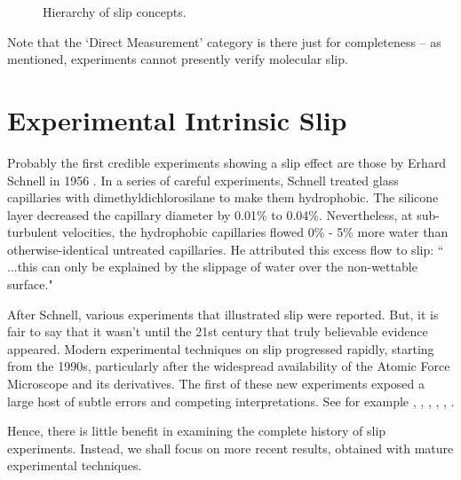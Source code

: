 \documentclass[12pt, a4paper, twoside, openright]{book}
\begin{document}
\begin{figure}[ht]
\caption{Hierarchy of slip concepts.} \label{slipconcepts}
\end{figure}

Note that the `Direct Measurement' category is there just for completeness -- as mentioned,  experiments cannot presently verify molecular slip.

\clearpage
\section{Experimental Intrinsic Slip}

Probably the first credible experiments showing a slip effect are those by Erhard Schnell in 1956 \cite{Schnell1956}. In a series of careful experiments, Schnell treated glass capillaries with dimethyldichlorosilane to make them hydrophobic. The silicone layer decreased the capillary diameter by 0.01\% to 0.04\%. Nevertheless, at sub-turbulent velocities, the hydrophobic capillaries flowed 0\% - 5\% more water than otherwise-identical untreated capillaries. He attributed this excess flow to slip: `` ...this can only be explained by the slippage of water over the non-wettable surface."  

After Schnell, various experiments that illustrated slip were reported. But, it is fair to say that it wasn't until the 21st century that truly believable evidence appeared.
Modern experimental techniques on slip progressed rapidly, starting from the 1990s, particularly after the widespread availability of the Atomic Force Microscope and its derivatives. 
The first of these new experiments exposed a large host of subtle errors and competing interpretations. 
See for example \cite{Pit2000}, \cite{CraigNetoWilliams2001}, \cite{BaudryCharlaix2001}, \cite{ZhuGranick2001}, \cite{Bonaccurso2002}, \cite{Neto2003}.

Hence, there is little benefit in examining the complete history of slip experiments.  Instead, we shall focus on more recent results, obtained with mature experimental techniques.
\end{document}

